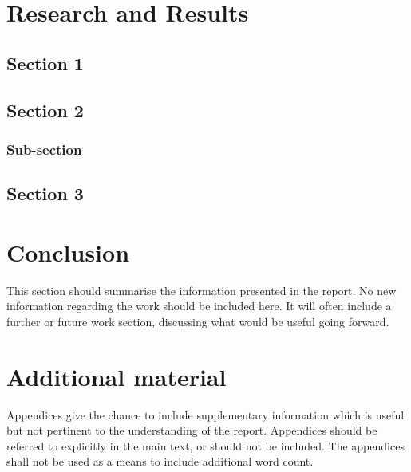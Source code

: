 \documentclass[a4paper,oneside,12pt]{book}
\begin{document}
\chapter{Research and Results}
\section{Section 1}

\section{Section 2}
\subsection{Sub-section}

\section{Section 3}

\chapter{Conclusion}
This section should summarise the information presented in the report. No new information regarding the work should be included here. It will often include a further or future work section, discussing what would be useful going forward.


\renewcommand{\bibname}{References}
 

\appendix
\chapter{Additional material}
Appendices give the chance to include supplementary information which is useful but not pertinent to the understanding of the report. Appendices should be referred to explicitly in the main text, or should not be included.	The appendices shall not be used as a means to include additional word count.
\end{document}
